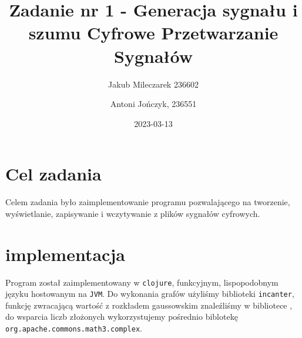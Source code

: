 \documentclass[12pt]{article}
\title{{\bf Zadanie nr 1 - Generacja sygnału i szumu}\linebreak
	Cyfrowe Przetwarzanie Sygnałów}
\author{Jakub Mileczarek 236602 \and Antoni Jończyk, 236551}
\date{2023-03-13} %
\newcommand{\BibTeX}{{\sc Bib}\TeX}
\begin{document}
\clearpage\maketitle
\thispagestyle{empty}
\newpage
\setcounter{page}{1}
\section{Cel zadania}
Celem zadania było zaimplementowanie programu pozwalającego na tworzenie,
wyświetlanie, zapisywanie i wczytywanie z plików sygnałów cyfrowych.



\section{implementacja}
Program został zaimplementowany w \texttt{clojure}, funkcyjnym, lispopodobnym języku hostowanym na \texttt{JVM}. Do wykonania grafów użyliśmy biblioteki \texttt{incanter}{\cite{incanter}}, funkcję zwracającą wartość z rozkładem gaussowskim znaleźliśmy w bibliotece , do wsparcia liczb złożonych wykorzystujemy pośrednio biblotekę \texttt{org.apache.commons.math3.complex}.
\end{document}
